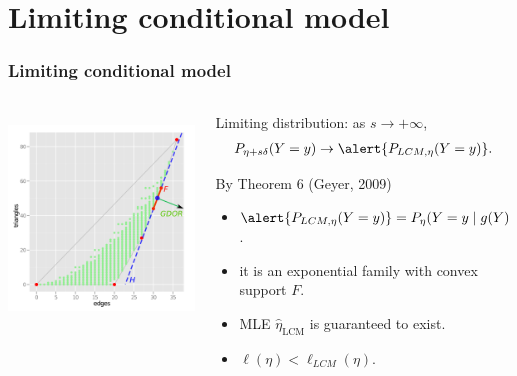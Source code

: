 \documentclass[ 10pt]{beamer}
\newcommand{\etaLCM}{\hat{\eta}_{\textrm{LCM}}}
\begin{document}
\section{Limiting conditional model}
\frame
{
	\frametitle{Limiting conditional model}
\begin{columns}[]
\begin{column}[T]{0.25\textwidth}
\includegraphics[height=2.2in,trim=3.5in 2in 0.15in 0.05in,clip=true]{g9-H.png}
\end{column} %

\begin{column}[t]{0.75\textwidth}
Limiting distribution: as $s \to +\infty$,
\begin{align*}
P_{\eta + s \delta}( Y = y) \to \alert{P_{LCM, \eta}( Y = y)}.
\end{align*}

\begin{block}{
By Theorem 6 (Geyer, 2009)}
\begin{itemize}
	\item $\alert{P_{LCM, \eta}( Y = y)} = P_{\eta}( Y =y \mid g(Y) \in H)$.
\vspace{1mm}
	
	\item it is an exponential family with convex support $F$.
\vspace{1mm}

	\item MLE $\etaLCM$ is guaranteed to exist.
\vspace{1mm}

	\item $\ell(\eta) < \ell_{LCM}(\eta)$.
\end{itemize}
\end{block}

\end{column}
\end{columns}
}
\end{document}
